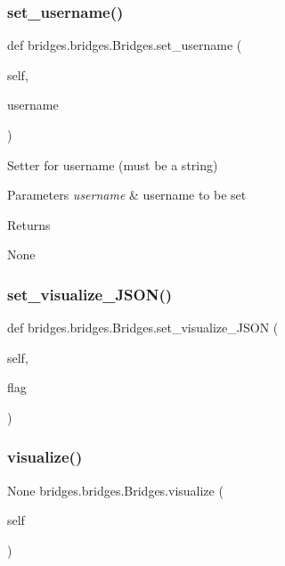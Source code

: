 \subsubsection{\texorpdfstring{set\_username()}{set\_username()}}
{\footnotesize\ttfamily def bridges.\+bridges.\+Bridges.\+set\+\_\+username (\begin{DoxyParamCaption}\item[{}]{self,  }\item[{}]{username }\end{DoxyParamCaption})}



Setter for username (must be a string) 


\begin{DoxyParams}{Parameters}
{\em username} & username to be set \\
\hline
\end{DoxyParams}
\begin{DoxyReturn}{Returns}


None 
\end{DoxyReturn}
\mbox{\label{classbridges_1_1bridges_1_1_bridges_ab50d018b5178ca33de24157b7b6de285}} 
\subsubsection{\texorpdfstring{set\_visualize\_JSON()}{set\_visualize\_JSON()}}
{\footnotesize\ttfamily def bridges.\+bridges.\+Bridges.\+set\+\_\+visualize\+\_\+\+J\+S\+ON (\begin{DoxyParamCaption}\item[{}]{self,  }\item[{}]{flag }\end{DoxyParamCaption})}

\mbox{\label{classbridges_1_1bridges_1_1_bridges_a822a7338e4dce27f7d8d0d322bdace08}} 
\subsubsection{\texorpdfstring{visualize()}{visualize()}}
{\footnotesize\ttfamily  None bridges.\+bridges.\+Bridges.\+visualize (\begin{DoxyParamCaption}\item[{}]{self }\end{DoxyParamCaption})}

